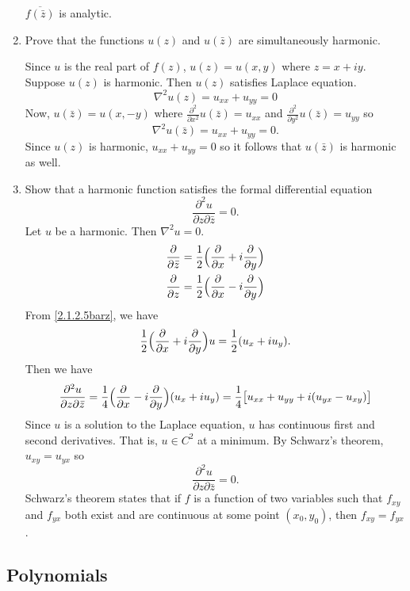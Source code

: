 \begin{enumerate}
  \(\overline{f(\bar{z})}\) is analytic.
\item
  Prove that the functions \(u(z)\) and \(u(\bar{z})\) are simultaneously
  harmonic.
  \par\smallskip
  Since \(u\) is the real part of \(f(z)\), \(u(z) = u(x,y)\) where
  \(z = x + iy\).
  Suppose \(u(z)\) is harmonic.
  Then \(u(z)\) satisfies Laplace equation.
  \[
  \nabla^2u(z) = u_{xx} + u_{yy} = 0
  \]
  Now, \(u(\bar{z}) = u(x,-y)\) where
  \(\frac{\partial^2}{\partial x^2}u(\bar{z}) = u_{xx}\) and
  \(\frac{\partial^2}{\partial y^2}u(\bar{z}) = u_{yy}\) so
  \[
  \nabla^2u(\bar{z}) = u_{xx} + u_{yy} = 0.
  \]
  Since \(u(z)\) is harmonic, \(u_{xx} + u_{yy} = 0\) so it follows that
  \(u(\bar{z})\) is harmonic as well.
\item
  Show that a harmonic function satisfies the formal differential equation
  \[
  \frac{\partial^2u}{\partial z\partial\bar{z}} = 0.
  \]
  Let \(u\) be a harmonic.
  Then \(\nabla^2u = 0\).
  \begin{subequations}
    \begin{align}
      \frac{\partial}{\partial\bar{z}}
      & = \frac{1}{2}\Bigl(\frac{\partial}{\partial x} +
        i\frac{\partial}{\partial y}\Bigr)\label{2.1.2.5barz}\\
      \frac{\partial}{\partial z}
      & = \frac{1}{2}\Bigl(\frac{\partial}{\partial x} -
        i\frac{\partial}{\partial y}\Bigr)\label{2.1.2.5z}
    \end{align}
  \end{subequations}
  From \cref{2.1.2.5barz}, we have
  \[
  \frac{1}{2}\Bigl(\frac{\partial}{\partial x} +
  i\frac{\partial}{\partial y}\Bigr)u = \frac{1}{2}(u_x + iu_y).
  \]
  Then we have
  \[
  \frac{\partial^2u}{\partial z\partial\bar{z}} =
  \frac{1}{4}\Bigl(\frac{\partial}{\partial x} -
  i\frac{\partial}{\partial y}\Bigr)(u_x + iu_y) =
  \frac{1}{4}\bigl[u_{xx} + u_{yy} + i(u_{yx} - u_{xy})\bigr]
  \]
  Since \(u\) is a solution to the Laplace equation, \(u\) has continuous first
  and second derivatives.
  That is, \(u\in C^2\) at a minimum.
  By Schwarz's theorem, \(u_{xy} = u_{yx}\) so
  \[
  \frac{\partial^2u}{\partial z\partial\bar{z}} = 0.
  \]
  Schwarz's theorem states that if \(f\) is a function of two variables such
  that \(f_{xy}\) and \(f_{yx}\) both exist and are continuous at some point
  \((x_0,y_0)\), then \(f_{xy} = f_{yx}\).
\end{enumerate}

\subsection{Polynomials}

